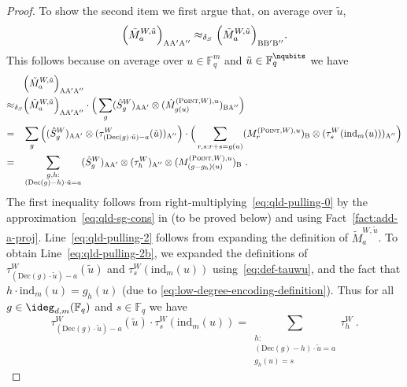 \documentclass[11pt]{article}
\theoremstyle{definition}
\newcommand{\F}{\ensuremath{\mathbb{F}}}
\newcommand{\ind}{\ensuremath{\mathrm{ind}}}
\newcommand{\labelstyle}[1]{\ensuremath{\textsc{#1}}\xspace}
\newcommand{\alice}{\labelstyle{A}}
\newcommand{\bob}{\labelstyle{B}}
\newcommand{\typestyle}[1]{\ensuremath{\textsc{#1}}\xspace}
\newcommand{\Point}{\typestyle{Point}}
\newcommand{\coded}{\mathrm{Dec}}
\begin{document}
\begin{proof}
To show the second item we first argue that, on average over $\tilde{u}$, 
	\begin{equation}
		\label{eq:qld-pulling-cons}
		\Big ( \tilde{M}^{W,\tilde{u}}_a \Big)_{\alice \alice' \alice''} \approx_{\delta_S} \Big ( \tilde{M}^{W,\tilde{u}}_a \Big)_{\bob \bob' \bob''}.
	\end{equation}
	This follows because on average over $u \in \F_q^m$ and $\tilde{u} \in \F_q^\nqubits$ we have
	\begin{align}
		&\Big ( \tilde{M}^{W,\tilde{u}}_a \Big)_{\alice \alice' \alice''} \label{eq:qld-pulling-0} \\
		\approx_{\delta_S}& \Big ( \tilde{M}^{W,\tilde{u}}_a \Big)_{\alice \alice'\alice''} \cdot \Big ( \sum_g (\hat{S}^W_g)_{\alice \alice'} \otimes  (\hat{M}^{(\Point,W),u}_{g(u)})_{\bob \alice''} \Big) \label{eq:qld-pulling-1} \\
		=_{\phantom{\delta_S}}& \sum_g \Big ( (\hat{S}^W_g)_{\alice \alice'} \otimes (\tau^W_{(\coded(g) \cdot \tilde{u}) - a}(\tilde{u}))_{\alice''} \Big) \cdot \Big(\sum_{r,s: r + s = g(u)} (M^{(\Point,W),u}_r)_{\bob} \otimes (\tau_s^W(\ind_m(u)))_{\alice''} \Big) \label{eq:qld-pulling-2} \\
		=_{\phantom{\delta_S}}& \sum_{\substack{g,h: \\ (\coded(g)-h)\cdot \tilde{u} = a}}  (\hat{S}^W_g)_{\alice \alice'} \otimes (\tau^W_h)_{\alice''} \otimes (M^{(\Point,W),u}_{(g-g_h)(u)})_{\bob}~. \label{eq:qld-pulling-2b}
	\end{align}
	The first inequality follows from right-multiplying~\eqref{eq:qld-pulling-0} by the approximation~\eqref{eq:qld-sg-cons} in  (to be proved below) and using Fact~\ref{fact:add-a-proj}. Line~\eqref{eq:qld-pulling-2} follows from expanding the definition of $\tilde{M}^{W,\tilde{u}}_a$.  To obtain Line~\eqref{eq:qld-pulling-2b}, we expanded the definitions of $\tau^W_{(\coded(g) \cdot \tilde{u}) - a}(\tilde{u})$ and $\tau^W_s(\ind_m(u))$ using~\cref{eq:def-tauwu}, and the fact that $h \cdot \ind_m(u) = g_h(u)$ (due to \cref{eq:low-degree-encoding-definition}). Thus for all $g \in \ideg_{d,m}(\F_q)$ and $s \in \F_q$ we have
	\[
		\tau^W_{(\coded(g) \cdot \tilde{u}) - a}(\tilde{u}) \cdot \tau^W_s(\ind_m(u)) = \sum_{\substack{h: \\ (\coded(g) - h) \cdot \tilde{u} = a \\ g_h(u) = s}} \tau^W_h~.
	\]



\end{proof}
\end{document}
